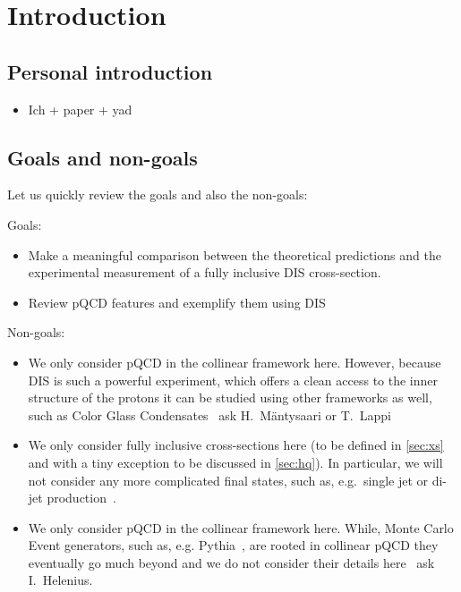 \section{Introduction}

\subsection{Personal introduction}
\begin{itemize}
    \item Ich + paper + yad
\end{itemize}

\subsection{Goals and non-goals}
Let us quickly review the goals and also the non-goals:

Goals:
\begin{itemize}
    \item Make a meaningful comparison between the theoretical predictions and the experimental measurement of a fully inclusive DIS cross-section.
    \item Review pQCD features and exemplify them using DIS
\end{itemize}

Non-goals:
\begin{itemize}
    \item We only consider pQCD in the collinear framework here.
        However, because DIS is such a powerful experiment, which offers a clean access to the inner structure of the protons it can be studied using other frameworks as well, such as Color Glass Condensates~\cite{Bertilsson:2026vtu,Casuga:2026xxt} \textrightarrow{} ask H.~Mäntysaari or T.~Lappi
    \item We only consider fully inclusive cross-sections here (to be defined in \cref{sec:xs} and with a tiny exception to be discussed in \cref{sec:hq}).
        In particular, we will not consider any more complicated final states, such as, e.g.\ single jet or di-jet production~\cite{H1:2014cbm}.
    \item We only consider pQCD in the collinear framework here.
        While, Monte Carlo Event generators, such as, e.g. Pythia~\cite{Bierlich:2022pfr}, are rooted in collinear pQCD they eventually go much beyond and we do not consider their details here~\cite{Helenius:2026odp} \textrightarrow{} ask I.~Helenius.
\end{itemize}

